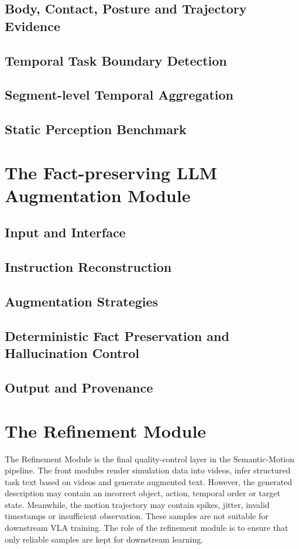 \documentclass[11pt,oneside]{report}
\begin{document}
\subsection{Body, Contact, Posture and Trajectory Evidence}
\subsection{Temporal Task Boundary Detection}
\subsection{Segment-level Temporal Aggregation}
\subsection{Static Perception Benchmark}

\section{The Fact-preserving LLM Augmentation Module}
\subsection{Input and Interface}
\subsection{Instruction Reconstruction}
\subsection{Augmentation Strategies}
\subsection{Deterministic Fact Preservation and Hallucination Control}
\subsection{Output and Provenance}

\section{The Refinement Module}

The Refinement Module is the final quality-control layer in the Semantic-Motion pipeline. The front modules render simulation data into videos, infer structured task text based on videos and generate augmented text. However, the generated description may contain an incorrect object, action, temporal order or target state. Meanwhile, the motion trajectory may contain spikes, jitter, invalid timestamps or insufficient observation. These samples are not suitable for downstream VLA training. The role of the refinement module is to ensure that only reliable samples are kept for downstream learning. 
\end{document}
